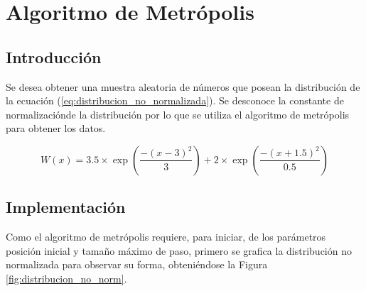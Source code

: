 \documentclass{article}
\begin{document}
\section{Algoritmo de Metrópolis}

\subsection{Introducción}

Se desea obtener una muestra aleatoria de números que posean la distribución de la ecuación (\ref{eq:distribucion_no_normalizada}). Se desconoce la constante de normalizaciónde la distribución por lo que se utiliza el algoritmo de metrópolis para obtener los datos.

\begin{equation}
  W(x) = 3.5 \times \exp\left({\frac{-(x-3)^2}{3}}\right) + 2 \times \exp{\left(\frac{-(x+1.5)^2}{0.5}\right)}
  \label{eq:distribucion_no_normalizada}
\end{equation}

\subsection{Implementación}

Como el algoritmo de metrópolis requiere, para iniciar, de los parámetros posición inicial y tamaño máximo de paso, primero se grafica la distribución no normalizada para observar su forma, obteniéndose la Figura \ref{fig:distribucion_no_norm}.

\begin{figure}
  
\end{figure}
\end{document}
